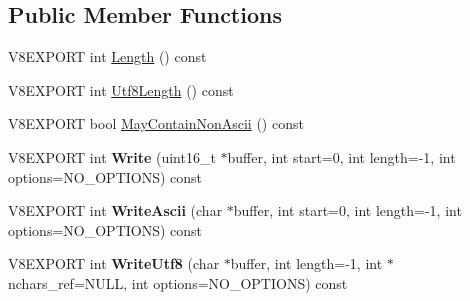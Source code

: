 \subsection*{Public Member Functions}
\begin{DoxyCompactItemize}
\item 
V8\+E\+X\+P\+O\+R\+T int \hyperlink{classv8_1_1_string_a812edd5c3beffb3a08ff94103ac31f23}{Length} () const 
\item 
V8\+E\+X\+P\+O\+R\+T int \hyperlink{classv8_1_1_string_a11d12cdcd49afe5a8bb12646fd8ec17a}{Utf8\+Length} () const 
\item 
V8\+E\+X\+P\+O\+R\+T bool \hyperlink{classv8_1_1_string_a4526b719c91f611b34ab5a807694afc2}{May\+Contain\+Non\+Ascii} () const 
\item 
\hypertarget{classv8_1_1_string_acb1144b0652bc44345bf2d52b1455c05}{}V8\+E\+X\+P\+O\+R\+T int {\bfseries Write} (uint16\+\_\+t $\ast$buffer, int start=0, int length=-\/1, int options=N\+O\+\_\+\+O\+P\+T\+I\+O\+N\+S) const \label{classv8_1_1_string_acb1144b0652bc44345bf2d52b1455c05}

\item 
\hypertarget{classv8_1_1_string_af60c183b13ca1caebc7ea5d4bde593e6}{}V8\+E\+X\+P\+O\+R\+T int {\bfseries Write\+Ascii} (char $\ast$buffer, int start=0, int length=-\/1, int options=N\+O\+\_\+\+O\+P\+T\+I\+O\+N\+S) const \label{classv8_1_1_string_af60c183b13ca1caebc7ea5d4bde593e6}

\item 
\hypertarget{classv8_1_1_string_ae8dca2507fe29952310f6ed65bcb58a4}{}V8\+E\+X\+P\+O\+R\+T int {\bfseries Write\+Utf8} (char $\ast$buffer, int length=-\/1, int $\ast$nchars\+\_\+ref=N\+U\+L\+L, int options=N\+O\+\_\+\+O\+P\+T\+I\+O\+N\+S) const \label{classv8_1_1_string_ae8dca2507fe29952310f6ed65bcb58a4}


\end{DoxyCompactItemize}
